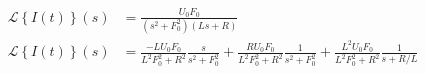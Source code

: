 \documentclass{article}
\newcommand{\Laplace}[1]{\mathcal{L}\left\{#1\right\}(s)}
\begin{document}
\begin{align*}
    \Laplace{I(t)}  & = \frac{U_0 F_0}{(s^2 + F_0^2)(Ls+R)} \\
    \Laplace{I(t)}  & = \frac{-L U_0 F_0}{L^2 F_0^2 + R^2}\frac{s}{s^2 + F_0^2} +  \frac{R U_0 F_0}{L^2 F_0^2 + R^2}\frac{1}{s^2 + F_0^2} + \frac{L^2 U_0 F_0}{L^2 F_0^2 + R^2}\frac{1}{s + R/L}  \\
\end{align*}
\end{document}
